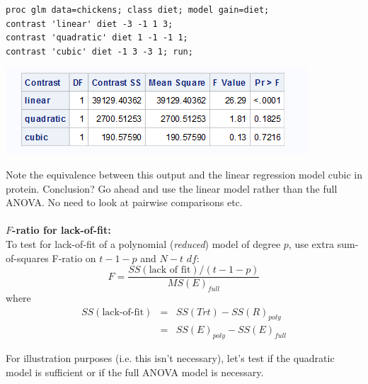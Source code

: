 \begin{small}
\begin{verbatim}
proc glm data=chickens; class diet; model gain=diet;
contrast 'linear' diet -3 -1 1 3;
contrast 'quadratic' diet 1 -1 -1 1;
contrast 'cubic' diet -1 3 -3 1; run;
\end{verbatim}
\end{small}

\begin{center}
\includegraphics[scale=0.8]{ChickensGLM3}
\end{center}

Note the equivalence between this output and the linear regression model cubic in protein.  Conclusion?  Go ahead and use the linear model rather than the full ANOVA.  No need to look at pairwise comparisons etc.\\~\\

\textbf{$F$-ratio for lack-of-fit:}\\ 
To test for lack-of-fit of a polynomial ({\em reduced}) model of degree $p$, use extra sum-of-squares F-ratio on $t-1-p$ and $N-t$ $df$:
$$ F=\frac{SS(\mbox{lack of fit})/(t-1-p)}{MS(E)_{full}}$$
where
\begin{eqnarray*}
SS(\mbox{lack-of-fit})  &=&  SS(Trt)-SS(R)_{poly} \\
&=&  SS(E)_{poly}-SS(E)_{full}
\end{eqnarray*}

For illustration purposes (i.e. this isn't necessary), let's test if the quadratic model is sufficient or if the full ANOVA model is necessary.





